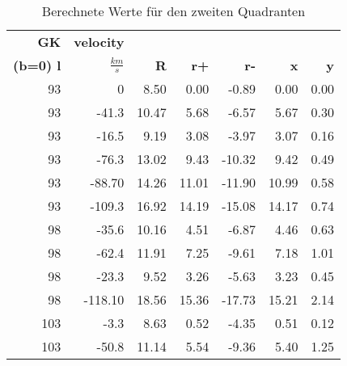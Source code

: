 \newpage
\begin{table}[H]
    \centering
    \caption{Berechnete Werte für den zweiten Quadranten}
\begin{tabular}{|r|r|r|r|r|r|r|}
    \hline
    {\textbf{GK}} & {\textbf{velocity}} & {} &   {} &   {} &    {} &    {} \\
    {\textbf{(b=0) l}} & {\textbf{$\si{}{\frac{km}{s}}$}} & {\textbf{R}} &   {\textbf{r+}} &   {\textbf{r-}} &    {\textbf{x}} &    {\textbf{y}} \\
    \hline
            93 &          0 &       8.50 &       0.00 &      -0.89 &       0.00 &       0.00 \\
    
            93 &      -41.3 &      10.47 &       5.68 &      -6.57 &       5.67 &       0.30 \\
    
            93 &      -16.5 &       9.19 &       3.08 &      -3.97 &       3.07 &       0.16 \\
    
            93 &      -76.3 &      13.02 &       9.43 &     -10.32 &       9.42 &       0.49 \\
    
            93 &     -88.70 &      14.26 &      11.01 &     -11.90 &      10.99 &       0.58 \\
    
            93 &     -109.3 &      16.92 &      14.19 &     -15.08 &      14.17 &       0.74 \\
    \hline
            98 &      -35.6 &      10.16 &       4.51 &      -6.87 &       4.46 &       0.63 \\
    
            98 &      -62.4 &      11.91 &       7.25 &      -9.61 &       7.18 &       1.01 \\
    
            98 &      -23.3 &       9.52 &       3.26 &      -5.63 &       3.23 &       0.45 \\
    
            98 &    -118.10 &      18.56 &      15.36 &     -17.73 &      15.21 &       2.14 \\
    \hline
           103 &       -3.3 &       8.63 &       0.52 &      -4.35 &       0.51 &       0.12 \\
    
           103 &      -50.8 &      11.14 &       5.54 &      -9.36 &       5.40 &       1.25 \\
    

\end{tabular}
\end{table}
